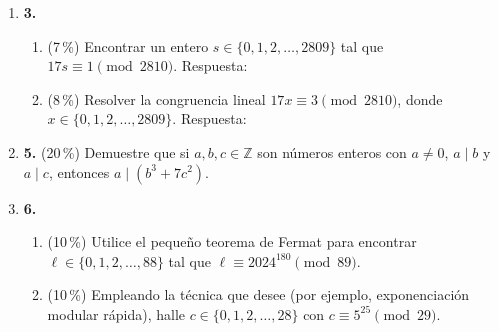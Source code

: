 \documentclass[11pt]{article}
\newcommand{\resp}{\underline{\hspace{3cm}}}
\begin{document}
\begin{enumerate}
\item[]\textbf{3.}
\begin{enumerate}[label=(\alph*)]
\item (7\,\%) Encontrar un entero $s \in \{0, 1, 2, \dots, 2809\}$ tal que $17s \equiv 1 \pmod{2810}$. \hfill Respuesta: \resp
\item (8\,\%) Resolver la congruencia lineal $17x \equiv 3 \pmod{2810}$, donde $x \in \{0, 1, 2, \dots, 2809\}$. \hfill Respuesta: \resp
\end{enumerate}

\item[]\textbf{5.} (20\,\%) Demuestre que si $a, b, c \in \mathbb{Z}$ son números enteros con $a \neq 0$, $a \mid b$ y $a \mid c$, entonces $a \mid (b^3 + 7c^2)$.

\item[]\textbf{6.}
\begin{enumerate}[label=(\alph*)]
\item (10\,\%) Utilice el pequeño teorema de Fermat para encontrar $\ell \in \{0, 1, 2, \dots, 88\}$ tal que $\ell \equiv 2024^{180} \pmod{89}$.
\item (10\,\%) Empleando la técnica que desee (por ejemplo, exponenciación modular rápida), halle $c \in \{0, 1, 2, \dots, 28\}$ con $c \equiv 5^{25} \pmod{29}$.
\end{enumerate}
\end{enumerate}

\vfill
{}
\end{document}
